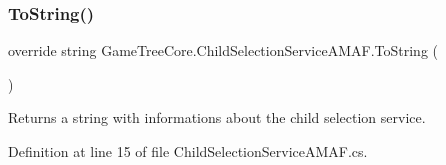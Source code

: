 \subsubsection{\texorpdfstring{To\+String()}{ToString()}}
{\footnotesize\ttfamily override string Game\+Tree\+Core.\+Child\+Selection\+Service\+A\+M\+A\+F.\+To\+String (\begin{DoxyParamCaption}{ }\end{DoxyParamCaption})}



Returns a string with informations about the child selection service. 



Definition at line 15 of file Child\+Selection\+Service\+A\+M\+A\+F.\+cs.

